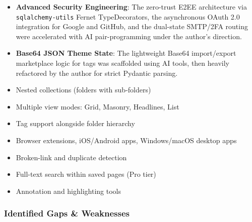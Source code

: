 \documentclass[11pt,a4paper]{book}
\begin{document}
\begin{itemize}
  \item \textbf{Advanced Security Engineering}: The zero-trust E2EE architecture via \texttt{sqlalchemy-utils} Fernet TypeDecorators, the asynchronous OAuth 2.0 integration for Google and GitHub, and the dual-state SMTP/2FA routing were accelerated with AI pair-programming under the author's direction.
  \item \textbf{Base64 JSON Theme State}: The lightweight Base64 import/export marketplace logic for tags was scaffolded using AI tools, then heavily refactored by the author for strict Pydantic parsing.

  \item Nested collections (folders with sub-folders)
  \item Multiple view modes: Grid, Masonry, Headlines, List
  \item Tag support alongside folder hierarchy
  \item Browser extensions, iOS/Android apps, Windows/macOS desktop apps
  \item Broken-link and duplicate detection
  \item Full-text search within saved pages (Pro tier)
  \item Annotation and highlighting tools
\end{itemize}

\subsubsection{Identified Gaps \& Weaknesses}
\end{document}
